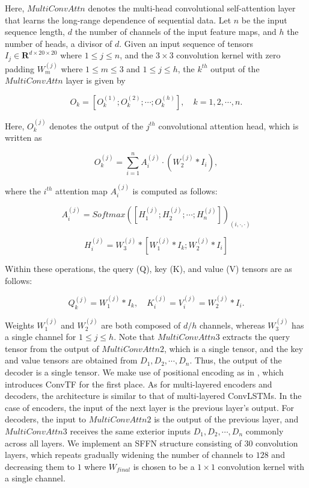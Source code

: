 \documentclass{article}
\begin{document}
Here, $MultiConvAttn$ denotes the multi-head convolutional self-attention layer that learns the long-range dependence of sequential data.
Let $n$ be the input sequence length, $d$ the number of channels of the input feature maps, and $h$ the number of heads, a divisor of $d$. 
Given an input sequence of tensors $I_j \in \textbf{R}^{d \times 20 \times 20}$ where $1 \leq j \leq n$, and the $3 \times 3$ convolution kernel with zero padding $W^{(j)}_{m}$ where $1 \leq m \leq 3$ and $1 \leq j \leq h$, the $k^{th}$ output of the $MultiConvAttn$ layer is given by

\begin{equation}
    O_{k} = [O^{(1)}_{k}; O^{(2)}_{k}; \cdots; O^{(h)}_{k}], \quad k = 1, 2, \cdots, n.
\end{equation}

Here, $O^{(j)}_{k}$ denotes the output of the $j^{th}$ convolutional attention head, which is written as

\begin{equation}
    O^{(j)}_{k} = \sum_{i=1}^{n} A^{(j)}_{i} \cdot (W^{(j)}_{2} * I_{i}),
\end{equation}

where the $i^{th}$ attention map $A^{(j)}_{i}$ is computed as follows:

\begin{equation}
    A^{(j)}_{i} = Softmax([H^{(j)}_{1}; H^{(j)}_{2}; \cdots; H^{(j)}_{n}])_{(i, \cdot, \cdot)}
\end{equation}

\begin{equation}
    H^{(j)}_{i} = W^{(j)}_{3} * [W^{(j)}_{1} * I_{k}; W^{(j)}_{2} * I_{i}]
\end{equation}

Within these operations, the query (Q), key (K), and value (V) tensors are as follows:

\begin{equation}
    Q^{(j)}_{k} = W^{(j)}_{1} * I_{k}, \quad K^{(j)}_{i} = V^{(j)}_{i} = W^{(j)}_{2} * I_{i}.
\end{equation}

Weights $W^{(j)}_{1}$ and $W^{(j)}_{2}$ are both composed of $d/h$ channels, whereas $W^{(j)}_{3}$ has a single channel for $1 \leq j \leq h$. 
Note that $MultiConvAttn3$ extracts the query tensor from the output of $MultiConvAttn2$, which is a single tensor, and the key and value tensors are obtained from $D_{1}, D_{2}, \cdots, D_{n}$. Thus, the output of the decoder is a single tensor.
We make use of positional encoding as in \citep{liu2021convtransformer}, which introduces ConvTF for the first place. 
As for multi-layered encoders and decoders, the architecture is similar to that of multi-layered ConvLSTMs. 
In the case of encoders, the input of the next layer is the previous layer's output. 
For decoders, the input to $MultiConvAttn2$ is the output of the previous layer, and $MultiConvAttn3$ receives the same exterior inputs $D_{1}, D_{2}, \cdots, D_{n}$ commonly across all layers. 
We implement an SFFN structure consisting of $30$ convolution layers, which repeats gradually widening the number of channels to $128$ and decreasing them to $1$ where $W_{final}$ is chosen to be a $1 \times 1$ convolution kernel with a single channel.
\end{document}
